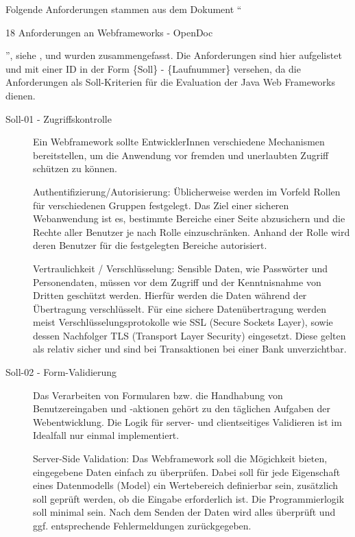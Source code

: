   Folgende Anforderungen stammen aus dem Dokument ``\begin{itshape}18
  Anforderungen an Webframeworks -
  OpenDoc\end{itshape}'', siehe \cite{AnforderungenAnWebframeworks}, und wurden
  zusammengefasst. Die Anforderungen sind hier aufgelistet und mit einer ID in
  der Form \{Soll\} - \{Laufnummer\} versehen, da die Anforderungen als
  Soll-Kriterien für die Evaluation der Java Web Frameworks dienen.
  
  \begin{description}

    \item[Soll-01 - Zugriffskontrolle\label{itm:Soll-01}]
    Ein Webframework sollte EntwicklerInnen verschiedene Mechanismen
    bereitstellen, um die Anwendung vor fremden und unerlaubten Zugriff schützen
    zu können.

    Authentifizierung/Autorisierung: Üblicherweise werden im Vorfeld Rollen für
    verschiedenen Gruppen festgelegt. Das Ziel einer sicheren Webanwendung ist
    es, bestimmte Bereiche einer Seite abzusichern und die Rechte aller
    Benutzer je nach Rolle einzuschränken. Anhand der Rolle wird deren
    Benutzer für die festgelegten Bereiche autorisiert.

    Vertraulichkeit / Verschlüsselung: Sensible Daten, wie Passwörter und
    Personendaten, müssen vor dem Zugriff und der Kenntnisnahme von Dritten
    geschützt werden. Hierfür werden die Daten während der Übertragung
    verschlüsselt. Für eine sichere Datenübertragung werden meist
    Verschlüsselungsprotokolle wie SSL (Secure Sockets Layer), sowie dessen
    Nachfolger TLS (Transport Layer Security) eingesetzt. Diese gelten als
    relativ sicher und sind bei Transaktionen bei einer Bank unverzichtbar.

    \item[Soll-02 - Form-Validierung\label{itm:Soll-02}]
    Das Verarbeiten von Formularen bzw. die Handhabung von Benutzereingaben und
    -aktionen gehört zu den täglichen Aufgaben der Webentwicklung. Die Logik
    für server- und clientseitiges Validieren ist im Idealfall nur einmal
    implementiert.

    Server-Side Validation: Das Webframework soll die Mögichkeit bieten,
    eingegebene Daten einfach zu überprüfen. Dabei soll für jede Eigenschaft
    eines Datenmodells (Model) ein Wertebereich definierbar sein, zusätzlich
    soll geprüft werden, ob die Eingabe erforderlich ist. Die Programmierlogik
    soll minimal sein. Nach dem Senden der Daten wird alles überprüft und ggf.
    entsprechende Fehlermeldungen zurückgegeben.


\end{description}

